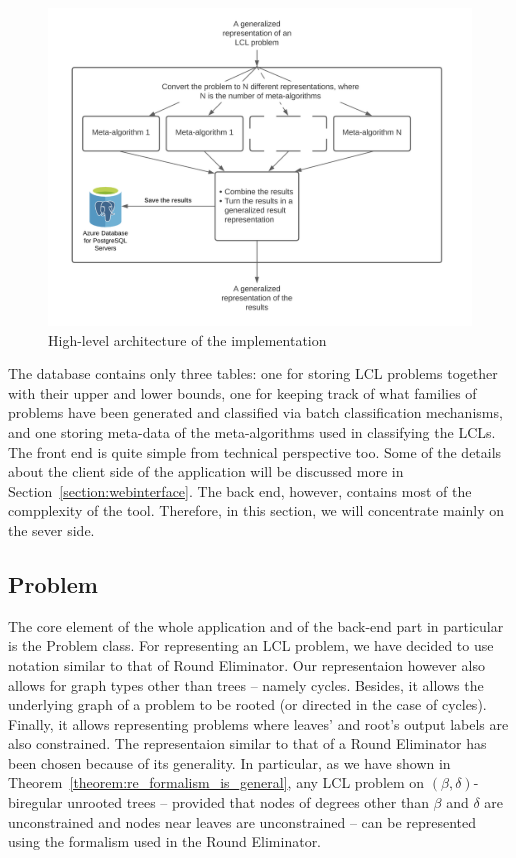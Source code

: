 \begin{figure}[ht]
  \begin{center}
    \includegraphics[width=\textwidth]{images/tool-architecture.png}
    \caption{High-level architecture of the implementation}
    \label{fig:implementation-architecture}
  \end{center}
\end{figure}

The database contains only three tables: one for
storing LCL problems together with their upper and
lower bounds, one for keeping track of what families of
problems have been generated and classified via batch
classification mechanisms, and one storing meta-data
of the meta-algorithms used in classifying the LCLs.
The front end is quite simple from technical perspective
too. Some of the details about the client side of the
application will be discussed more in Section~\ref{section:webinterface}.
The back end, however, contains most of the compplexity of
the tool. Therefore, in this section, we will concentrate
mainly on the sever side.

\subsection{Problem}

The core element of the whole application and of the
back-end part in particular is the Problem class.
For representing an LCL problem, we have decided
to use notation similar to that of Round
Eliminator. Our representaion however also
allows for graph types other than trees -- namely cycles.
Besides, it allows the underlying graph of a problem
to be rooted (or directed in the case of cycles).
Finally, it allows representing problems where
leaves' and root's output labels are also constrained.
The representaion similar to that of a Round
Eliminator has been chosen because of its generality.
In particular, as we have shown in Theorem~\ref{theorem:re_formalism_is_general},
any LCL problem
on $(\beta, \delta)$-biregular unrooted trees -- provided
that nodes of degrees other than $\beta$ and $\delta$ are unconstrained
and nodes near leaves are unconstrained -- can be represented
using the formalism used in the Round Eliminator.

